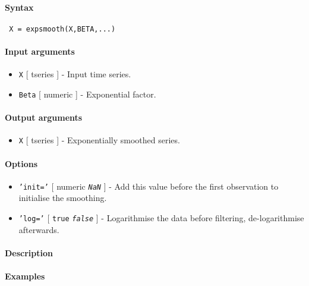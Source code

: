 


	\paragraph{Syntax}
 
 \begin{verbatim}
 X = expsmooth(X,BETA,...)
 \end{verbatim}
 
 \paragraph{Input arguments}
 
 \begin{itemize}
 \item
   \texttt{X} {[} tseries {]} - Input time series.
 \item
   \texttt{Beta} {[} numeric {]} - Exponential factor.
 \end{itemize}
 
 \paragraph{Output arguments}
 
 \begin{itemize}
 \item
   \texttt{X} {[} tseries {]} - Exponentially smoothed series.
 \end{itemize}
 
 \paragraph{Options}
 
 \begin{itemize}
 \item
   \texttt{'init='} {[} numeric \textbar{} \emph{\texttt{NaN}} {]} - Add
   this value before the first observation to initialise the smoothing.
 \item
   \texttt{'log='} {[} \texttt{true} \textbar{} \emph{\texttt{false}} {]}
   - Logarithmise the data before filtering, de-logarithmise afterwards.
 \end{itemize}
 
 \paragraph{Description}
 
 \paragraph{Examples}


